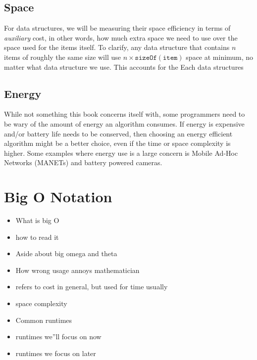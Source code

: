 \subsection{Space}

For data structures, we will be measuring their space efficiency in terms of \textit{auxiliary} cost, in other words, how much extra space we need to use over the space used for the items itself.   To clarify, any data structure that contains $ n $ items of roughly the same size will use $ n \times \mathtt{sizeOf(item)}$ space at minimum, no matter what data structure we use.  This accounts for the 
Each data structures 

\subsection{Energy}
While not something this book concerns itself with, some programmers need to be wary of the amount of energy  an algorithm consumes.  If energy is expensive and/or battery life needs to be conserved, then choosing an energy efficient algorithm might be a better choice, even if the time or space complexity is higher.  Some examples where energy use is a large concern  is Mobile Ad-Hoc Networks (MANETs) and battery powered cameras.


\section{Big O Notation}

\begin{itemize}
	\item What is big O
	
	\item  how to read it
	\item Aside about big omega and theta
	\item How wrong usage annoys mathematician
	\item refers to cost in general, but used for time usually
	\item  space complexity 
	\item Common runtimes
	\item runtimes we''ll focus on now
	\item runtimes we focus on later
\end{itemize}



